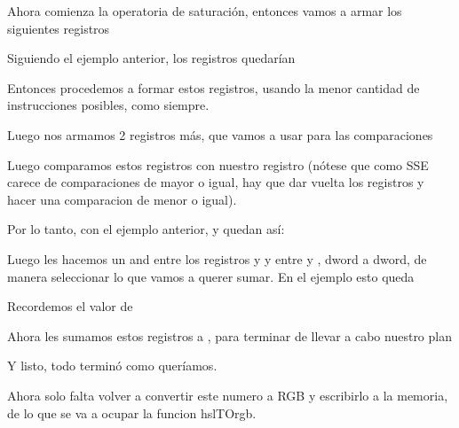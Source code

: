 

Ahora comienza la operatoria de saturación, entonces vamos a armar los siguientes registros



Siguiendo el ejemplo anterior, los registros quedarían





Entonces procedemos a formar estos registros, usando la menor cantidad de instrucciones posibles, como siempre.

Luego nos armamos 2 registros más, que vamos a usar para las comparaciones




Luego comparamos estos registros con nuestro registro  (nótese que como SSE carece de comparaciones de mayor o igual, hay que dar vuelta los registros y hacer una comparacion de menor o igual).

Por lo tanto, con el ejemplo anterior,  y  quedan así:




Luego les hacemos un and entre los registros  y  y entre  y , dword a dword, de manera seleccionar lo que vamos a querer sumar. En el ejemplo esto queda




Recordemos el valor de 



Ahora les sumamos estos registros a , para terminar de llevar a cabo nuestro plan


Y listo, todo terminó como queríamos.

Ahora solo falta volver a convertir este numero a RGB y escribirlo a la memoria, de lo que se va a ocupar la funcion hslTOrgb.

